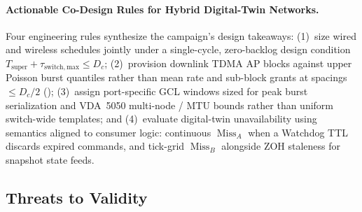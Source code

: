 \documentclass[11pt,a4paper]{article}
\newcommand{\Tsuper}{\ensuremath{T_{\mathrm{super}}}}
\newcommand{\MissA}{\ensuremath{\operatorname{Miss}_A}}
\newcommand{\MissB}{\ensuremath{\operatorname{Miss}_B}}
\begin{document}
\paragraph{Actionable Co-Design Rules for Hybrid Digital-Twin Networks.}
Four engineering rules synthesize the campaign's design takeaways: (1)~size wired and wireless schedules jointly under a single-cycle, zero-backlog design condition $\Tsuper + \tau_{\mathrm{switch,max}} \le D_c$; (2)~provision downlink TDMA AP blocks against upper Poisson burst quantiles rather than mean rate and sub-block grants at spacings $\le D_c/2$ (); (3)~assign port-specific GCL windows sized for peak burst serialization and VDA~5050 multi-node / MTU bounds rather than uniform switch-wide templates; and (4)~evaluate digital-twin unavailability using semantics aligned to consumer logic: continuous $\MissA$ when a Watchdog TTL discards expired commands, and tick-grid $\MissB$ alongside ZOH staleness for snapshot state feeds.

\subsection{Threats to Validity}
\label{sec:threats}
\end{document}
